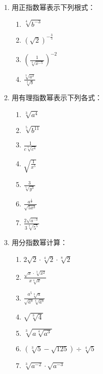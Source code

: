 \begin{enumerate}
\item 用正指数幂表示下列根式：
\begin{multicols}{2}
    \begin{enumerate}
\item $\sqrt[4]{b^{-3}}$
\item $\left(\sqrt{2}\right)^{-\tfrac{3}{5}}$
\item $\left(\frac{1}{\sqrt[4]{x^{-5}}}\right)^{-2}$
\item $\frac{\sqrt[3]{a^2}}{\sqrt[3]{b}}$
    \end{enumerate}
\end{multicols}
\item 用有理指数幂表示下列各式：
\begin{multicols}{2}
    \begin{enumerate}
\item $\sqrt[3]{a^4}$
\item $\sqrt[5]{b^{11}}$
\item $\frac{1}{c\sqrt[5]{c^4}}$
\item $\sqrt{\frac{1}{x^5}}$
\item $\frac{3}{\sqrt[5]{y^3}}$
\item $\frac{a^{\tfrac{1}{2}}}{\sqrt{5x^3}}$
\item $\frac{2\sqrt{a^{-3}}}{3\sqrt[3]{5^5}}$
    \end{enumerate}
\end{multicols}


\item 用分指数幂计算：
\begin{multicols}{2}
    \begin{enumerate}
\item $2\sqrt{2}\cdot \sqrt[4]{2}\cdot \sqrt[8]{2}$
\item $\frac{\sqrt{x}\cdot \sqrt[3]{x^2}}{x\sqrt[6]{x}}$
\item $\frac{a^5\sqrt[3]{a}}{\sqrt{a^3}\sqrt[6]{a^3}}$
\item $\sqrt{\sqrt[3]{4}}$
\item $\sqrt[3]{a\sqrt[4]{a^3}}$
\item $\left(\sqrt[3]{5}-\sqrt{125}\right)\div \sqrt[4]{5}$
\item $\sqrt[3]{a^{-2}}\cdot \sqrt{a^{-3}}$
    \end{enumerate}
\end{multicols}


\end{enumerate}
